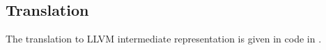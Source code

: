 
%
%

\subsection{Translation}
\label{sec:TranslatedExample}
The translation to LLVM intermediate representation is given in code in .

